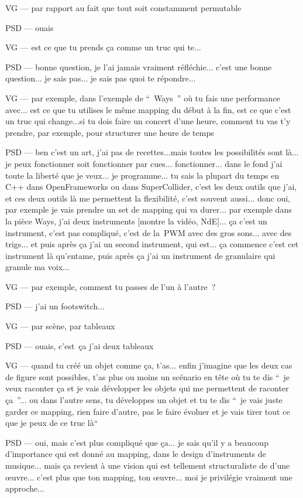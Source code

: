VG — par rapport au fait que tout soit constamment permutable

PSD — ouais

VG — est ce que tu prends ça comme un truc qui te...

PSD — bonne question, je l'ai jamais vraiment réfléchie... c'est une bonne question... je sais pas... je sais pas quoi te répondre...

VG — par exemple, dans l'exemple de “ Ways ” où tu fais une performance avec... est ce que tu utilises le même mapping du début à la fin, est ce que c'est un truc qui change...si tu dois faire un concert d'une heure, comment tu vas t'y prendre,  par exemple, pour structurer une heure de temps 

PSD — ben c'est un art, j'ai pas de recettes...mais toutes les possibilités sont là... je peux fonctionner soit fonctionner par cues... fonctionner... dans le fond j'ai toute la liberté que je veux... je programme... tu sais la plupart du temps en C++ dans OpenFrameworks ou dans SuperCollider, c'est les deux outils que j'ai, et ces deux outils là me permettent la flexibilité, c'est souvent aussi... donc oui, par exemple je vais prendre un set de mapping qui va durer... par exemple dans la pièce Ways, j'ai deux instruments [montre la vidéo, NdE]... ça c'est un instrument, c'est pas compliqué, c'est de la PWM avec des gros sons... avec des trigs... et puis après ça j'ai un second instrument, qui est... ça commence c'est cet instrument là qu'entame, puis après ça j'ai un instrument de granulaire qui granule ma voix...

VG — par exemple, comment tu passes de l'un à l'autre ?

PSD — j'ai un footswitch...

VG — par scène, par tableaux

PSD — ouais, c'est ça j'ai deux tableaux

VG — quand tu créé un objet comme ça, t'as... enfin j'imagine que les deux cas de figure sont possibles, t'as plus ou moins un scénario en tête où tu te dis “ je veux raconter ça et je vais développer les objets qui me permettent de raconter ça ”... ou dans l'autre sens, tu développes un objet et tu te dis “ je vais juste garder ce mapping, rien faire d'autre, pas le faire évoluer et je vais tirer tout ce que je peux de ce truc là“ 

PSD — oui, mais c'est plus compliqué que ça... je sais qu'il y a beaucoup d'importance qui est donné au mapping, dans le design d'instruments de musique... mais ça revient à une vision qui est tellement structuraliste de d'une œuvre... c'est plus que ton mapping, ton œuvre... moi je privilégie vraiment une approche...

